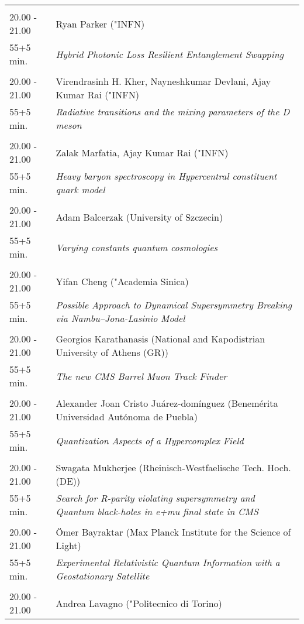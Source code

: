 \begin{longtable}{p{3cm}p{13cm}}
 & \\ 
20.00 - 21.00 & Ryan Parker ("INFN)\\ 
55+5 min. & {\it Hybrid Photonic Loss Resilient Entanglement Swapping}\\ 
 & \\ 
20.00 - 21.00 & Virendrasinh H. Kher, Nayneshkumar Devlani, Ajay Kumar Rai ("INFN)\\ 
55+5 min. & {\it Radiative transitions and the mixing parameters of the D meson}\\ 
 & \\ 
20.00 - 21.00 & Zalak Marfatia, Ajay Kumar Rai ("INFN)\\ 
55+5 min. & {\it Heavy baryon spectroscopy in Hypercentral constituent quark model}\\ 
 & \\ 
20.00 - 21.00 & Adam Balcerzak (University of Szczecin)\\ 
55+5 min. & {\it Varying constants quantum cosmologies}\\ 
 & \\ 
20.00 - 21.00 & Yifan Cheng ("Academia Sinica)\\ 
55+5 min. & {\it Possible Approach to Dynamical Supersymmetry Breaking via Nambu--Jona-Lasinio Model}\\ 
 & \\ 
20.00 - 21.00 & Georgios Karathanasis (National and Kapodistrian University of Athens (GR))\\ 
55+5 min. & {\it The new CMS Barrel Muon Track Finder}\\ 
 & \\ 
20.00 - 21.00 & Alexander Joan Cristo Juárez-domínguez (Benemérita Universidad Autónoma de Puebla)\\ 
55+5 min. & {\it Quantization Aspects of a Hypercomplex Field}\\ 
 & \\ 
20.00 - 21.00 & Swagata Mukherjee (Rheinisch-Westfaelische Tech. Hoch. (DE))\\ 
55+5 min. & {\it Search for R-parity violating supersymmetry and Quantum black-holes in e+mu final state in CMS}\\ 
 & \\ 
20.00 - 21.00 & Ömer Bayraktar (Max Planck Institute for the Science of Light)\\ 
55+5 min. & {\it Experimental Relativistic Quantum Information with a Geostationary Satellite}\\ 
 & \\ 
20.00 - 21.00 & Andrea Lavagno ("Politecnico di Torino)\\ 

\end{longtable}
